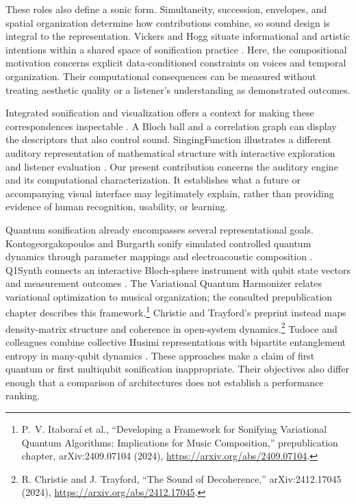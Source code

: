 \documentclass[pdflatex,iicol,sn-basic,Numbered]{sn-jnl}
\begin{document}
These roles also define a sonic form. Simultaneity, succession, envelopes, and spatial organization determine how contributions combine, so sound design is integral to the representation. Vickers and Hogg situate informational and artistic intentions within a shared space of sonification practice \citep{VickersHogg2006}. Here, the compositional motivation concerns explicit data-conditioned constraints on voices and temporal organization. Their computational consequences can be measured without treating aesthetic quality or a listener's understanding as demonstrated outcomes.

Integrated sonification and visualization offers a context for making these correspondences inspectable \citep{Enge2024}. A Bloch ball and a correlation graph can display the descriptors that also control sound. SingingFunction illustrates a different auditory representation of mathematical structure with interactive exploration and listener evaluation \citep{GrondHermann2012}. Our present contribution concerns the auditory engine and its computational characterization. It establishes what a future or accompanying visual interface may legitimately explain, rather than providing evidence of human recognition, usability, or learning.

Quantum sonification already encompasses several representational goals. Kontogeorgakopoulos and Burgarth sonify simulated controlled quantum dynamics through parameter mappings and electroacoustic composition \citep{Kontogeorgakopoulos2014}. Q1Synth connects an interactive Bloch-sphere instrument with qubit state vectors and measurement outcomes \citep{Miranda2023}. The Variational Quantum Harmonizer relates variational optimization to musical organization; the consulted prepublication chapter describes this framework.\footnote{P.~V. Itabora\'i et al., ``Developing a Framework for Sonifying Variational Quantum Algorithms: Implications for Music Composition,'' prepublication chapter, arXiv:2409.07104 (2024), \url{https://arxiv.org/abs/2409.07104}.} Christie and Trayford's preprint instead maps density-matrix structure and coherence in open-system dynamics.\footnote{R. Christie and J. Trayford, ``The Sound of Decoherence,'' arXiv:2412.17045 (2024), \url{https://arxiv.org/abs/2412.17045}.} Tudoce and colleagues combine collective Husimi representations with bipartite entanglement entropy in many-qubit dynamics \citep{Tudoce2026}. These approaches make a claim of first quantum or first multiqubit sonification inappropriate. Their objectives also differ enough that a comparison of architectures does not establish a performance ranking.
\end{document}
